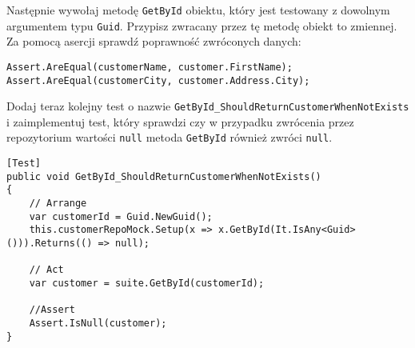 Następnie wywołaj metodę \texttt{GetById} obiektu, który jest testowany z dowolnym argumentem typu \texttt{Guid}. Przypisz zwracany przez tę metodę obiekt to zmiennej. Za pomocą asercji sprawdź poprawność zwróconych danych:
\begin{lstlisting}
Assert.AreEqual(customerName, customer.FirstName);
Assert.AreEqual(customerCity, customer.Address.City);
\end{lstlisting}

Dodaj teraz kolejny test o nazwie \texttt{GetById\_ShouldReturnCustomerWhenNotExists} i zaimplementuj test, który sprawdzi czy w przypadku zwrócenia przez repozytorium wartości \texttt{null} metoda \texttt{GetById} również zwróci \texttt{null}. 
\begin{lstlisting}
[Test]
public void GetById_ShouldReturnCustomerWhenNotExists()
{
	// Arrange
	var customerId = Guid.NewGuid();
	this.customerRepoMock.Setup(x => x.GetById(It.IsAny<Guid>())).Returns(() => null);
	
	// Act
	var customer = suite.GetById(customerId);
	
	//Assert
	Assert.IsNull(customer);
}
\end{lstlisting}